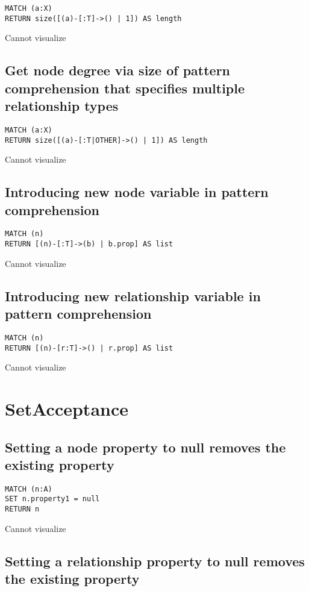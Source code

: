 \begin{lstlisting}
MATCH (a:X)
RETURN size([(a)-[:T]->() | 1]) AS length
\end{lstlisting}

Cannot visualize
\subsection{Get node degree via size of pattern comprehension that specifies multiple relationship types}

\begin{lstlisting}
MATCH (a:X)
RETURN size([(a)-[:T|OTHER]->() | 1]) AS length
\end{lstlisting}

Cannot visualize
\subsection{Introducing new node variable in pattern comprehension}

\begin{lstlisting}
MATCH (n)
RETURN [(n)-[:T]->(b) | b.prop] AS list
\end{lstlisting}

Cannot visualize
\subsection{Introducing new relationship variable in pattern comprehension}

\begin{lstlisting}
MATCH (n)
RETURN [(n)-[r:T]->() | r.prop] AS list
\end{lstlisting}

Cannot visualize
\section{SetAcceptance}

\subsection{Setting a node property to null removes the existing property}

\begin{lstlisting}
MATCH (n:A)
SET n.property1 = null
RETURN n
\end{lstlisting}

Cannot visualize
\subsection{Setting a relationship property to null removes the existing property}

